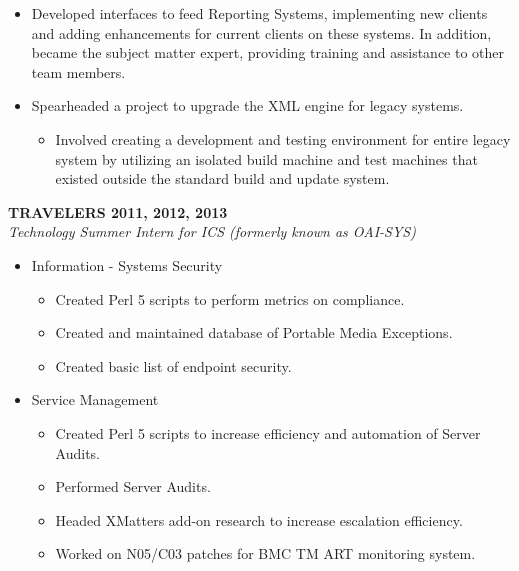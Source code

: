 \begin{cvparagraph}
\begin{itemize}
   \item Developed interfaces to feed Reporting Systems, implementing new clients 
      and adding enhancements for current clients on these systems. In addition, 
      became the subject matter expert, providing training and assistance to 
      other team members.

   \item Spearheaded a project to upgrade the XML engine for legacy systems.
   \begin{itemize}
      \item Involved creating a development and testing environment for entire
         legacy system by utilizing an isolated build machine and test machines
         that existed outside the standard build and update system.
   \end{itemize}
\end{itemize}


{\normalsize \textbf{ TRAVELERS \hfill 2011, 2012, 2013}} \\
{\sl Technology Summer Intern for ICS (formerly known as OAI-SYS)} \\

\begin{itemize}
   \item Information - Systems Security
   \begin{itemize}
      \item Created Perl 5 scripts to perform metrics on compliance.
      \item Created and maintained database of Portable Media Exceptions.
      \item Created basic list of endpoint security.
   \end{itemize}

   \item Service Management
   \begin{itemize}
      \item Created Perl 5 scripts to increase efficiency and automation of 
         Server Audits.
      \item Performed Server Audits.
      \item Headed XMatters add-on research to increase escalation efficiency.
      \item Worked on N05/C03 patches for BMC TM ART monitoring system.
   \end{itemize}


\end{itemize}
\end{cvparagraph}
